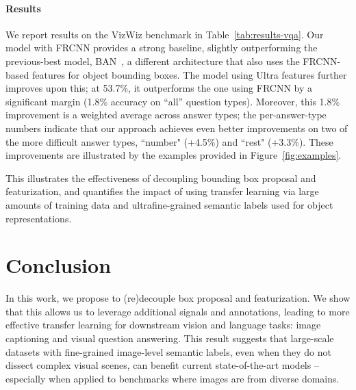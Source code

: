 \documentclass[11pt,a4paper]{article}
\begin{document}
\paragraph{Results}
We report results on the VizWiz benchmark in Table~\ref{tab:results-vqa}.
Our model with FRCNN provides a strong baseline, slightly outperforming the previous-best model, BAN~\cite{kim18banvizwiz}, a different architecture that also uses the FRCNN-based features for object bounding boxes.
The model using Ultra features further improves upon this; at 53.7\%, it outperforms the one using FRCNN by a significant margin (1.8\% accuracy on ``all'' question types).
Moreover, this 1.8\% improvement is a weighted average across answer types; the per-answer-type numbers indicate that our approach achieves even better improvements on two of the more difficult answer types, ``number" (+4.5\%) and ``rest" (+3.3\%).
These improvements are illustrated by the examples provided in Figure~\ref{fig:examples}.

This illustrates the effectiveness of decoupling bounding box proposal and featurization, and quantifies the impact of using transfer learning via large amounts of training data and ultrafine-grained semantic labels used for object representations.
 \section{Conclusion}

In this work, we propose to (re)decouple box proposal and featurization.
We show that this allows us to leverage additional signals and annotations,
leading to more effective transfer learning for downstream vision and language tasks: image captioning and visual question answering.
This result suggests that large-scale datasets with fine-grained image-level semantic labels,
even when they do not dissect complex visual scenes, can benefit current state-of-the-art models -- especially when applied to benchmarks where images are from diverse domains.
 



\newpage
\appendix
\end{document}
